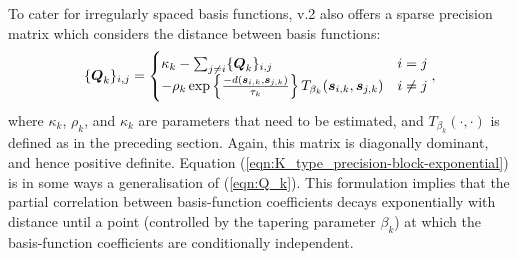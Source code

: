 \documentclass[article]{jss}
\def\mbf#1{{%
\mathchoice%
{\hbox{\boldmath$\displaystyle{#1}$}}%
{\hbox{\boldmath$\textstyle{#1}$}}%
{\hbox{\boldmath$\scriptstyle{#1}$}}%
{\hbox{\boldmath$\scriptscriptstyle{#1}$}}%
}}
\def\vec{\mbf}
\begin{document}
\begin{appendix}
 To cater for irregularly spaced basis functions,  v.2 also offers a sparse precision matrix which considers the distance between basis functions:  
\begin{equation}\label{eqn:K_type_precision-block-exponential}
\{\vec{Q}_{k}\}_{i, j}
=
\begin{cases}
\kappa_k -\sum_{j \neq i}\{\vec{Q}_{k}\}_{i, j}  & i = j\\
-\rho_k \exp \left\{\frac{-d(\vec{s}_{i, k}, \vec{s}_{j, k})}{\tau_k}\right\}
    T_{\beta_k}(\vec{s}_{i, k}, \vec{s}_{j, k})  & i \neq j\\
\end{cases},
\end{equation}
where $\kappa_k$, $\rho_k$, and $\kappa_k$ are parameters that need to be estimated, and $T_{\beta_k}(\cdot, \cdot)$ is defined as in the preceding section. 
 Again, this matrix is diagonally dominant, and hence positive definite. 
 Equation (\ref{eqn:K_type_precision-block-exponential}) is in some ways a generalisation of (\ref{eqn:Q_k}).
 This formulation implies that the partial correlation between basis-function coefficients decays exponentially with distance until a point (controlled by the tapering parameter $\beta_k$) at which the basis-function coefficients are conditionally independent. 








\end{appendix}
\end{document}
